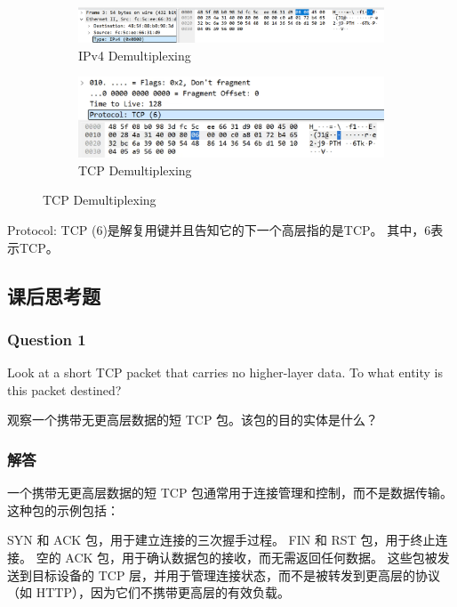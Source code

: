\documentclass[14pt,a4paper,UTF8,twoside]{article}
\begin{document}
\begin{figure}[H]
  \centering
  \begin{subfigure}{0.6\textwidth}
    \centering
    \includegraphics[width=\textwidth]{lab1/IPV4.png}
    \caption{IPv4 Demultiplexing}
  \end{subfigure}
  
  \bigskip

  \begin{subfigure}{0.5\textwidth}
    \centering
    \includegraphics[width=\textwidth]{lab1/demul.jpg}
    \caption{TCP Demultiplexing}
  \end{subfigure}
\end{figure}

Protocol: TCP (6)是解复用键并且告知它的下一个高层指的是TCP。
其中，6表示TCP。

\subsection{课后思考题}

\subsubsection{Question 1}
Look at a short TCP packet that carries no higher-layer data. To what entity is this packet destined?

观察一个携带无更高层数据的短 TCP 包。该包的目的实体是什么？

\subsubsection*{解答}

一个携带无更高层数据的短 TCP 包通常用于连接管理和控制，而不是数据传输。这种包的示例包括：

SYN 和 ACK 包，用于建立连接的三次握手过程。
FIN 和 RST 包，用于终止连接。
空的 ACK 包，用于确认数据包的接收，而无需返回任何数据。
这些包被发送到目标设备的 TCP 层，并用于管理连接状态，而不是被转发到更高层的协议（如 HTTP），因为它们不携带更高层的有效负载。
\end{document}
